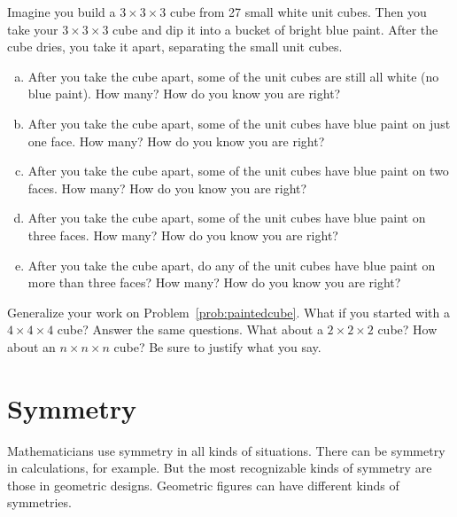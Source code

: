 \begin{problem}\label{prob:paintedcube}
Imagine you build a $3\times3\times3$ cube from 27 small  white unit cubes.    Then you take your $3\times3\times 3$ cube and dip it into a bucket of bright blue paint.  After the cube dries, you take it apart, separating  the small unit cubes.  

\medskip

\begin{enumerate}[(a)]
\item
After you take the cube apart, some of the unit cubes are still all white (no blue paint).  How many?  How do you know you are right?\\

\item
After you take the cube apart, some of the unit cubes have blue paint on just one face.  How many?  How do you know you are right?\\

\item
After you take the cube apart, some of the unit cubes have blue paint on two faces.  How many?  How do you know you are right?\\

\item
After you take the cube apart, some of the unit cubes have blue paint on three faces.  How many?  How do you know you are right?\\

\item
After you take the cube apart, do any of the unit cubes have blue paint on more than three faces?  How many?  How do you know you are right?\\

\end{enumerate}

\end{problem}

\bigskip

\begin{problem}
Generalize your work on Problem~\ref{prob:paintedcube}.  What if you started with a $4\times4\times4$ cube?  Answer the same questions.  What about a $2\times2\times2$ cube?  How about an $n\times n\times n$ cube?  Be sure to justify what you say.
\end{problem}





\newpage

\section{Symmetry}
Mathematicians use symmetry in all kinds of situations.  There can be symmetry in calculations, for example. But  the most recognizable kinds of symmetry are those in geometric designs.  Geometric figures can have different kinds of symmetries.


